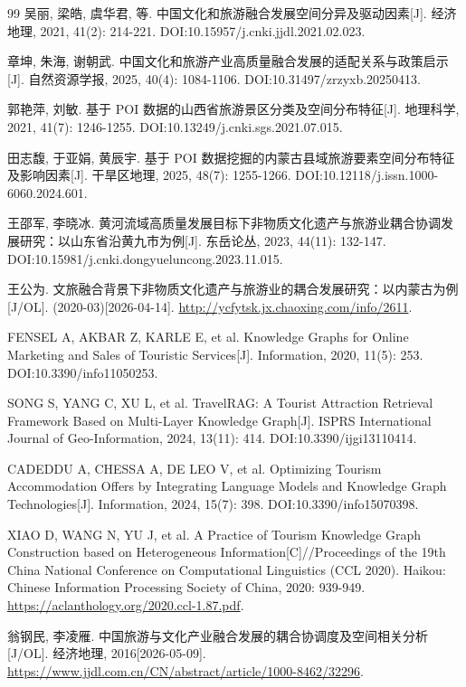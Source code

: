 
\begin{thebibliography}{99}
   吴丽, 梁皓, 虞华君, 等. 中国文化和旅游融合发展空间分异及驱动因素[J]. 经济地理, 2021, 41(2): 214-221. DOI:10.15957/j.cnki.jjdl.2021.02.023.

   章坤, 朱海, 谢朝武. 中国文化和旅游产业高质量融合发展的适配关系与政策启示[J]. 自然资源学报, 2025, 40(4): 1084-1106. DOI:10.31497/zrzyxb.20250413.

   郭艳萍, 刘敏. 基于 POI 数据的山西省旅游景区分类及空间分布特征[J]. 地理科学, 2021, 41(7): 1246-1255. DOI:10.13249/j.cnki.sgs.2021.07.015.

   田志馥, 于亚娟, 黄辰宇. 基于 POI 数据挖掘的内蒙古县域旅游要素空间分布特征及影响因素[J]. 干旱区地理, 2025, 48(7): 1255-1266. DOI:10.12118/j.issn.1000-6060.2024.601.

   王邵军, 李晓冰. 黄河流域高质量发展目标下非物质文化遗产与旅游业耦合协调发展研究：以山东省沿黄九市为例[J]. 东岳论丛, 2023, 44(11): 132-147. DOI:10.15981/j.cnki.dongyueluncong.2023.11.015.

   王公为. 文旅融合背景下非物质文化遗产与旅游业的耦合发展研究：以内蒙古为例[J/OL]. (2020-03)[2026-04-14]. \url{http://ycfytsk.jx.chaoxing.com/info/2611}.

   FENSEL A, AKBAR Z, KARLE E, et al. Knowledge Graphs for Online Marketing and Sales of Touristic Services[J]. Information, 2020, 11(5): 253. DOI:10.3390/info11050253.

   SONG S, YANG C, XU L, et al. TravelRAG: A Tourist Attraction Retrieval Framework Based on Multi-Layer Knowledge Graph[J]. ISPRS International Journal of Geo-Information, 2024, 13(11): 414. DOI:10.3390/ijgi13110414.

   CADEDDU A, CHESSA A, DE LEO V, et al. Optimizing Tourism Accommodation Offers by Integrating Language Models and Knowledge Graph Technologies[J]. Information, 2024, 15(7): 398. DOI:10.3390/info15070398.

   XIAO D, WANG N, YU J, et al. A Practice of Tourism Knowledge Graph Construction based on Heterogeneous Information[C]//Proceedings of the 19th China National Conference on Computational Linguistics (CCL 2020). Haikou: Chinese Information Processing Society of China, 2020: 939-949. \url{https://aclanthology.org/2020.ccl-1.87.pdf}.

   翁钢民, 李凌雁. 中国旅游与文化产业融合发展的耦合协调度及空间相关分析[J/OL]. 经济地理, 2016[2026-05-09]. \url{https://www.jjdl.com.cn/CN/abstract/article/1000-8462/32296}.


\end{thebibliography}
